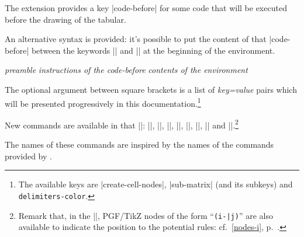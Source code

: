 \documentclass[dvipsnames]{article}
\begin{document}
\medskip
The extension  provides a key |code-before| for some code that
will be executed before the drawing of the tabular. 

\medskip 
An alternative syntax is provided: it's possible to put the content of that
|code-before| between the keywords |\CodeBefore| and |\Body| at the beginning
of the environment.

\smallskip
\begin{Code}
\begin{pNiceArray}{\textsl{preamble}}
\emph{}
  \textsl{instructions of the code-before}
\emph{\Body}
  \textsl{contents of the environment}
\end{pNiceArray}
\end{Code}

\smallskip
The optional argument between square brackets is a list of \textsl{key=value}
pairs which will be presented progressively in this
documentation.\footnote{The available keys are |create-cell-nodes|,
|sub-matrix| (and its subkeys) and \texttt{delimiters-color}.}

\medskip
New commands are available in that |\CodeBefore|: |\cellcolor|,
|\rectanglecolor|, |\rowcolor|, |\columncolor|, |\rowcolors|,
|\rowlistcolors|, |\chessboardcolors| and |\arraycolor|.\footnote{Remark that,
in the |\CodeBefore|, PGF/TikZ nodes of the form ``\verb+(i-|j)+'' are
also available to indicate the position to the potential rules:
cf.~\ref{nodes-i}, p.~\pageref{nodes-i}.}
\label{code-before}


The names of these commands are inspired by the names of the commands provided
by .
\end{document}
